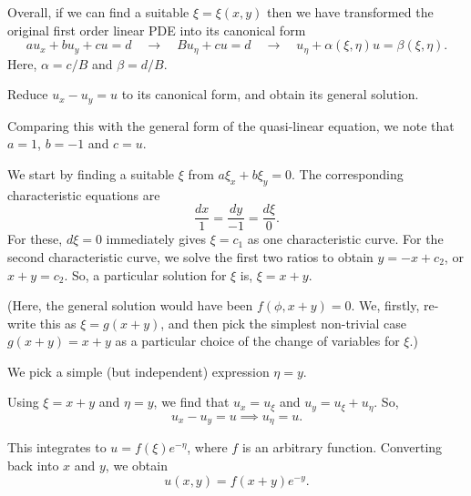 \documentclass[11pt]{penrose}
\begin{document}
Overall, if we can find a suitable $\xi = \xi(x,y)$ then we have transformed the original first order linear PDE into its canonical form
\begin{equation}
    a u_x + b u_y + c u = d
    \quad\to\quad B u_\eta + cu = d
    \quad\to\quad u_\eta + \alpha(\xi, \eta) u = \beta(\xi, \eta).
\end{equation}
Here, $\alpha = c/B$ and $\beta = d/B$.

\begin{negg}
    Reduce $u_x - u_y = u$ to its canonical form, and obtain its general solution.

    Comparing this with the general form of the quasi-linear equation, we note that $a = 1$, $b = -1$ and $c = u$.

    We start by finding a suitable $\xi$ from $a \xi_x + b \xi_y = 0$. The corresponding characteristic equations are
    \begin{equation*}
        \frac{dx}{1} = \frac{dy}{-1} = \frac{d\xi}{0}.
    \end{equation*}
    For these, $d\xi = 0$ immediately gives $\xi = c_1$ as one characteristic curve. For the second characteristic curve, we solve the first two ratios to obtain $y = -x + c_2$, or $x + y = c_2$. So, a particular solution for $\xi$ is, $\xi = x+y$.

    (Here, the general solution would have been $f(\phi, x+y) = 0$. We, firstly, re-write this as $\xi = g(x+y)$, and then pick the simplest non-trivial case $g(x+y) = x+y$ as a particular choice of the change of variables for $\xi$.)

    We pick a simple (but independent) expression $\eta = y$.

    Using $\xi = x+y$ and $\eta = y$, we find that $u_x = u_\xi$ and $u_y = u_\xi + u_\eta$. So,
    \begin{equation}
        u_x - u_y = u
        \implies
        u_\eta = u.
    \end{equation}

    This integrates to $u = f(\xi) e^{-\eta}$, where $f$ is an arbitrary function. Converting back into $x$ and $y$, we obtain
    \begin{equation}
        u(x, y) = f(x+y) e^{-y}.
    \end{equation}
\end{negg}
\end{document}
